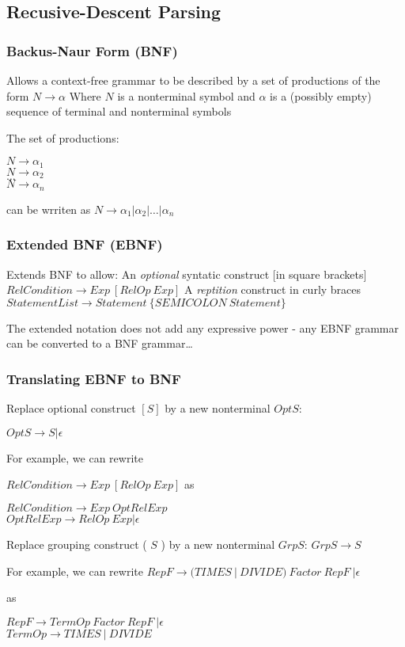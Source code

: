 \subsection{Recusive-Descent Parsing}
\subsubsection{Backus-Naur Form (BNF)}
Allows a context-free grammar to be described by a set of productions of the form
$N \rightarrow \alpha$
Where $N$ is a nonterminal symbol and $\alpha$ is a (possibly empty) sequence of terminal and nonterminal symbols

The set of productions:

$N \rightarrow \alpha_1$ \\
$N \rightarrow \alpha_2$ \\
$\ldots$ \\[0.1cm]
$N \rightarrow \alpha_n$

can be wrriten as
$N \rightarrow \alpha_1 | \alpha_2 | \ldots | \alpha_n$

\subsubsection{Extended BNF (EBNF)}
Extends BNF to allow:
An \emph{optional} syntatic construct [in square brackets]
$RelCondition \rightarrow Exp \ [RelOp \ Exp]$
A \emph{reptition} construct {in curly braces}
$StatementList \rightarrow Statement \ \{SEMICOLON \ Statement \}$

The extended notation does not add any expressive power - any EBNF grammar can be converted to a BNF grammar\dots

\subsubsection{Translating EBNF to BNF}

Replace optional construct $[S]$ by a new nonterminal $OptS$:

$OptS \rightarrow S | \epsilon$

For example, we can rewrite

$RelCondition \rightarrow Exp \ [RelOp \ Exp]$
as

$RelCondition \rightarrow Exp \ OptRelExp$ \\
$OptRelExp \rightarrow RelOp \ Exp | \epsilon$

Replace grouping construct ( $S$ ) by a new nonterminal $GrpS$:
$GrpS \rightarrow S$

For example, we can rewrite
$RepF \rightarrow (TIMES \ | \ DIVIDE) \ Factor \ RepF \ | \epsilon$

as 

$RepF \rightarrow TermOp \ Factor \ RepF \ | \epsilon$ \\
$TermOp \rightarrow TIMES \ | \ DIVIDE$